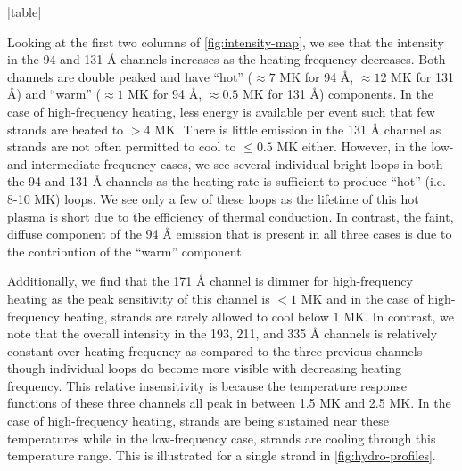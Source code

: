 |table|

Looking at the first two columns of \autoref{fig:intensity-map}, we see that the intensity in the 94 and 131 \AA{} channels increases as the heating frequency decreases. Both channels are double peaked and have ``hot'' ($\approx7$ MK for 94 \AA{}, $\approx12$ MK for 131 \AA{}) and ``warm'' ($\approx1$ MK for 94 \AA{}, $\approx0.5$ MK for 131 \AA{}) components. In the case of high-frequency heating, less energy is available per event such that few strands are heated to $>4$ MK. There is little emission in the 131 \AA{} channel as strands are not often permitted to cool to $\leq0.5$ MK either. However, in the low- and intermediate-frequency cases, we see several individual bright loops in both the 94 and 131 \AA{} channels as the heating rate is sufficient to produce ``hot'' (i.e. 8-10 MK) loops. We see only a few of these loops as the lifetime of this hot plasma is short due to the efficiency of thermal conduction. In contrast, the faint, diffuse component of the 94 \AA{} emission that is present in all three cases is due to the contribution of the ``warm'' component. 

Additionally, we find that the 171 \AA{} channel is dimmer for high-frequency heating as the peak sensitivity of this channel is $<1$ MK and in the case of high-frequency heating, strands are rarely allowed to cool below $1$ MK. In contrast, we note that the overall intensity in the 193, 211, and 335 \AA{} channels is relatively constant over heating frequency as compared to the three previous channels though individual loops do become more visible with decreasing heating frequency. This relative insensitivity is because the temperature response functions of these three channels all peak in between 1.5 MK and 2.5 MK. In the case of high-frequency heating, strands are being sustained near these temperatures while in the low-frequency case, strands are cooling through this temperature range. This is illustrated for a single strand in \autoref{fig:hydro-profiles}.

